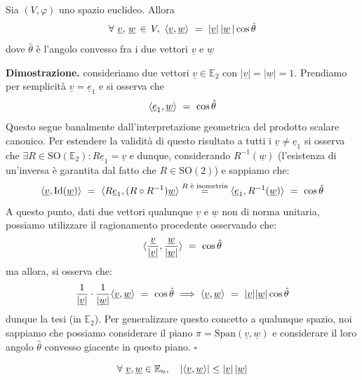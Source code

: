 %
\vspace{0.5cm}
\begin{theorem} 
	Sia $(V, \varphi)$ uno spazio euclideo. Allora 
	\[\forall\ \underline{v},\, \underline{w}\, \in\, V,\ \innerprod{\underline{v}}{\underline{w}}\ =\ |\underline{v}| \, | \underline{w}\, | \cos{\hat{\theta}}\] dove $\hat{\theta}$ è l'angolo convesso fra i due vettori $\underline{v}$ e $\underline{w}$
\end{theorem}
%
\noindent\textbf{Dimostrazione. }  
%
consideriamo due vettori $\underline{v} \in \mathbb{E}_2$ con $| \underline{v} | = | \underline{w} | = 1$. Prendiamo per semplicità $\underline{v} = \underline{e}_1$ e si osserva che
%
\[ \innerprod{\underline{e}_1}{\underline{w}}\ =\ \cos{ \hat{\theta} } \]
%
Questo segue banalmente dall'interpretazione geometrica del prodotto scalare canonico. 
%
Per estendere la validità di questo risultato a tutti i $\underline{v} \neq \underline{e}_1$ si osserva che $\exists R \in \text{SO}(\mathbb{E}_2): R\underline{e}_1 = \underline{v}$ e dunque, considerando $R^{-1}(\underline{w})$ (l'esistenza di un'inversa è garantita dal fatto che $R \in \text{SO}(2)$) e sappiamo che:
%
\[ \innerprod{\underline{v}}{ \text{Id}(\underline{w}) }\ =\ \innerprod{R \underline{e}_1}{(R \circ R^{-1})\underline{w}} \stackrel{R\text{ è isometria} }{=} \innerprod{\underline{e}_1}{R^{-1}(\underline{w})}\ =\ \cos{\hat{\theta}} \]
%
A questo punto, dati due vettori qualunque $\underline{v}$ e $\underline{w}$ non di norma unitaria, possiamo utilizzare il ragionamento procedente osservando che:
%
\[ \langle  \frac{\underline{v} }{ |\underline{v}|} , \frac{\underline{w}}{ |\underline{w}| }  \rangle \ =\ \cos{ \hat{\theta} } \]
%
ma allora, si osserva che:
%
\[ \frac{1}{|\underline{v}|} \cdot \frac{1}{|\underline{w}|} \langle \underline{v}, \underline{w}  \rangle \ =\ \cos{\hat{\theta}} \implies \langle \underline{v},  \underline{w} \rangle\ =\ |\underline{v}| |\underline{w}| \cos{\hat{\theta}} \]
%
dunque la tesi (in $\mathbb{E}_2$). 
Per generalizzare questo concetto a qualunque spazio, noi sappiamo che possiamo considerare il piano $\pi = \text{Span}(\underline{v}, \underline{w})$ e considerare il loro angolo $\hat{\theta}$ convesso giacente in questo piano.
\hfill $\square$
%
\vspace{0.5cm}
\begin{prop}[\textcolor{blue}{Disuguaglianza di Cauchy-Schwarz}]
\[\forall\ \underline{v}, \underline{w} \in \mathbb{E}_n, \quad | \langle \underline{v}, \underline{w} \rangle | \leq |\underline{v}| \, |\underline{w}|\]
\label{prop:dis_cs}
\end{prop}
